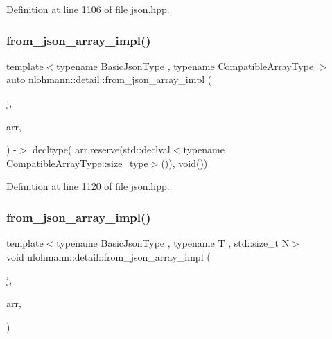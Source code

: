 Definition at line 1106 of file json.\+hpp.

\mbox{\label{namespacenlohmann_1_1detail_a57f93ed57254a1639087cdc316e0fb83}} 
\subsubsection{\texorpdfstring{from\+\_\+json\+\_\+array\+\_\+impl()}{from\_json\_array\_impl()}\hspace{0.1cm}{\footnotesize\ttfamily [2/3]}}
{\footnotesize\ttfamily template$<$typename Basic\+Json\+Type , typename Compatible\+Array\+Type $>$ \\
auto nlohmann\+::detail\+::from\+\_\+json\+\_\+array\+\_\+impl (\begin{DoxyParamCaption}\item[{const Basic\+Json\+Type \&}]{j,  }\item[{Compatible\+Array\+Type \&}]{arr,  }\item[{\hyperlink{structnlohmann_1_1detail_1_1priority__tag}{priority\+\_\+tag}$<$ 1 $>$}]{ }\end{DoxyParamCaption}) -\/$>$ decltype(
    arr.\+reserve(std\+::declval$<$typename Compatible\+Array\+Type\+::size\+\_\+type$>$()),
    void())
}



Definition at line 1120 of file json.\+hpp.

\mbox{\label{namespacenlohmann_1_1detail_a46b0781205d0bdc5a959343b389966a4}} 
\subsubsection{\texorpdfstring{from\+\_\+json\+\_\+array\+\_\+impl()}{from\_json\_array\_impl()}\hspace{0.1cm}{\footnotesize\ttfamily [3/3]}}
{\footnotesize\ttfamily template$<$typename Basic\+Json\+Type , typename T , std\+::size\+\_\+t N$>$ \\
void nlohmann\+::detail\+::from\+\_\+json\+\_\+array\+\_\+impl (\begin{DoxyParamCaption}\item[{const Basic\+Json\+Type \&}]{j,  }\item[{\hyperlink{namespacenlohmann_1_1detail_a1ed8fc6239da25abcaf681d30ace4985af1f713c9e000f5d3f280adbd124df4f5}{std\+::array}$<$ T, N $>$ \&}]{arr,  }\item[{\hyperlink{structnlohmann_1_1detail_1_1priority__tag}{priority\+\_\+tag}$<$ 2 $>$}]{ }\end{DoxyParamCaption})}



